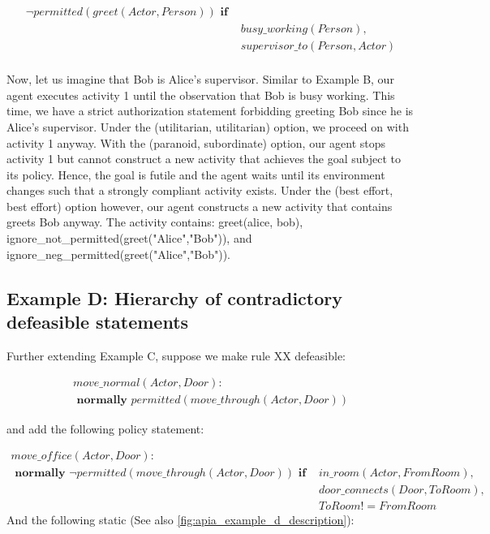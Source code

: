 \begin{equation}
\begin{split}
\neg permitted(greet(Actor, Person)) \textbf{ if } \\
    & busy\_working(Person), \\
    & supervisor\_to(Person, Actor) \\
\end{split}
\end{equation}

Now, let us imagine that Bob is Alice’s supervisor.
Similar to Example B, our agent executes activity 1 until the observation that Bob is busy working.
This time, we have a strict authorization statement forbidding greeting Bob since he is Alice’s supervisor.
Under the (utilitarian, utilitarian) option, we proceed on with activity 1 anyway.
With the (paranoid, subordinate) option, our agent stops activity 1 but cannot construct a new activity that achieves the goal subject to its policy.
Hence, the goal is futile and the agent waits until its environment changes such that a strongly compliant activity exists.
Under the (best effort, best effort) option however, our agent constructs a new activity that contains greets Bob anyway.
The activity contains: greet(alice, bob), ignore\_not\_permitted(greet("Alice","Bob")), and ignore\_neg\_permitted(greet("Alice","Bob")).

\subsection{Example D: Hierarchy of contradictory defeasible statements}

Further extending Example C, suppose we make rule XX defeasible:

\begin{equation}
\begin{split}
move\_normal(Actor, Door): \\
\textbf{ normally } permitted(move\_through(Actor, Door))
\end{split}
\end{equation}

and add the following policy statement:

\begin{equation}
\begin{split}
move\_office(Actor, Door): \\
\textbf{ normally } \neg permitted(move\_through(Actor, Door)) \textbf{ if }
    & in\_room(Actor, FromRoom), \\
    & door\_connects(Door, ToRoom), \\
    & ToRoom != FromRoom
\end{split}
\end{equation}
And the following static (See also \cref{fig:apia_example_d_description}):

